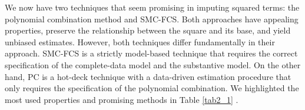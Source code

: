 	We now have two techniques that seem promising in imputing squared terms: the polynomial combination method and SMC-FCS. Both approaches have appealing properties, preserve the relationship between the square and its base, and yield unbiased estimates. However, both techniques differ fundamentally in their approach. SMC-FCS is a strictly model-based technique that requires the correct specification of the complete-data model and the substantive model. On the other hand, PC is a hot-deck technique with a data-driven estimation procedure that only requires the specification of the polynomial combination. We highlighted the most used properties and promising methods in Table \ref{tab2_1} \citep{vonhippe2009, Vink2013, bartlett2015multiple}.
	\begin{table}[ht!]
		\caption{Summary of properties of four squared term imputation methods.}
		\label{tab2_1}
	\end{table} 
	
	
	
